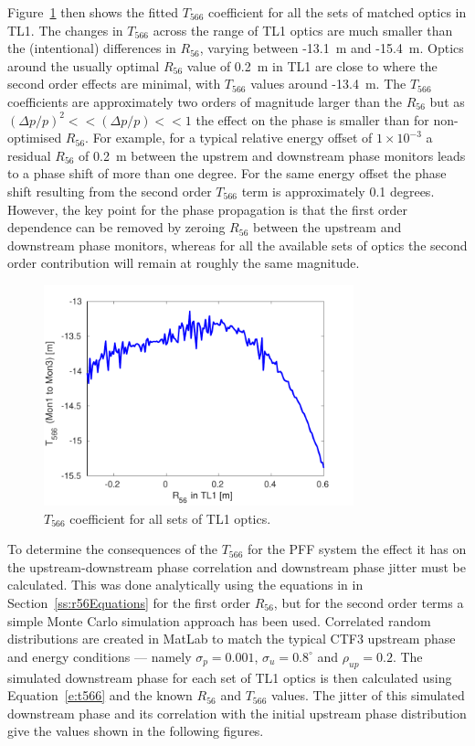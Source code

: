 Figure~\ref{f:t566TotVsr56TL1} then shows the fitted \(T_{566}\) coefficient for all the sets of matched optics in TL1. The changes in \(T_{566}\) across the range of TL1 optics are much smaller than the (intentional) differences in \(R_{56}\), varying between -13.1~m and -15.4~m. Optics around the usually optimal \(R_{56}\) value of 0.2~m in TL1  are close to where the second order effects are minimal, with \(T_{566}\) values around -13.4~m. The \(T_{566}\) coefficients are approximately two orders of magnitude larger than the \(R_{56}\) but as \(\left(\Delta p / p\right)^2 << \left(\Delta p / p\right) << 1\) the effect on the phase is smaller than for non-optimised \(R_{56}\). For example, for a typical relative energy offset of \(1 \times 10^{-3}\) a residual \(R_{56}\) of 0.2~m between the upstrem and downstream phase monitors leads to a phase shift of more than one degree. For the same energy offset the phase shift resulting from the second order \(T_{566}\) term is approximately 0.1 degrees. However, the key point for the phase propagation is that the first order dependence can be removed by zeroing \(R_{56}\) between the upstream and downstream phase monitors, whereas for all the available sets of optics the second order contribution will remain at roughly the same magnitude.

\begin{figure}
  \centering
  \includegraphics[width=0.8\textwidth]{Figures/propagation/t566TotVsr56TL1}
  \caption{\(T_{566}\) coefficient for all sets of TL1 optics.}
  \label{f:t566TotVsr56TL1}
\end{figure}

To determine the consequences of the \(T_{566}\) for the PFF system the effect it has on the upstream-downstream phase correlation and downstream phase jitter must be calculated. This was done analytically using the equations in in Section~\ref{ss:r56Equations} for the first order \(R_{56}\), but for the second order terms a simple Monte Carlo simulation approach has been used. Correlated random distributions are created in MatLab to match the typical CTF3 upstream phase and energy conditions --- namely \(\sigma_p = 0.001\), \(\sigma_u = 0.8^\circ\) and \(\rho_{up} = 0.2\). The simulated downstream phase for each set of TL1 optics is then calculated using Equation~\ref{e:t566} and the known \(R_{56}\) and \(T_{566}\) values. The jitter of this simulated downstream phase and its correlation with the initial upstream phase distribution give the values shown in the following figures.

